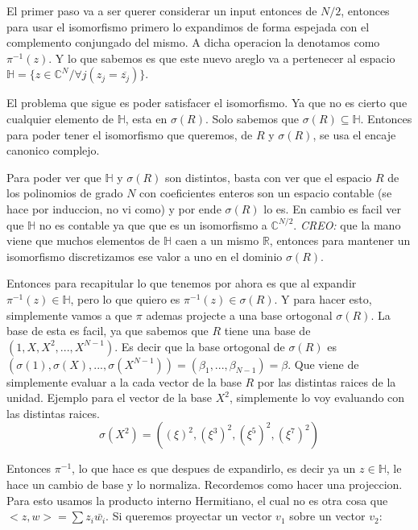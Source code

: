 \documentclass[12pt, oneside]{article}
\begin{document}
El primer paso va a ser  querer considerar un input entonces de $N/2$, entonces
para usar el isomorfismo primero lo expandimos de forma espejada con el
complemento conjungado del mismo.
A dicha operacion la denotamos como $\pi^{-1}(z)$.
Y lo que sabemos es que este nuevo areglo va a pertenecer al espacio
$\mathbb{H}=\{z\in\mathbb{C}^N/ \forall j (z_j=\overline{z_j})\}$.

El problema que sigue es poder satisfacer el isomorfismo.
Ya que no es cierto que cualquier elemento de $\mathbb{H}$,
esta en $\sigma(R)$.
Solo sabemos que $\sigma(R)\subseteq \mathbb{H}$.
Entonces para poder tener el isomorfismo que queremos, de $R$ y $\sigma(R)$,
se usa el encaje canonico complejo.

Para poder ver que $\mathbb{H}$ y $\sigma(R)$ son distintos, basta con ver que
el espacio $R$ de los polinomios de grado $N$ con coeficientes enteros son un espacio
contable (se hace por induccion, no vi como) y por ende $\sigma(R)$ lo es.
En cambio es facil ver que $\mathbb{H}$ no es contable ya que que es un isomorfismo
a $\mathbb{C}^{N/2}$.
\textit{CREO:} que la mano viene que muchos elementos de $\mathbb{H}$ caen a un mismo $\mathbb{R}$,
entonces para mantener un isomorfismo discretizamos ese valor a uno en el dominio $\sigma(R)$.

Entonces para recapitular lo que tenemos por ahora es que al expandir $\pi^{-1}(z)\in\mathbb{H}$,
pero lo que quiero es $\pi^{-1}(z)\in\sigma(R)$.
Y para hacer esto, simplemente vamos a que $\pi$ ademas projecte a una base ortogonal  $\sigma(R)$.
La base de esta es facil, ya que sabemos que $R$ tiene una base de $(1, X, X^2, ..., X^{N-1})$.
Es decir que la base ortogonal de  $\sigma(R)$ es $(\sigma(1), \sigma(X),..., \sigma(X^{N-1}))=(\beta_1,...,\beta_{N-1})=\beta$.
Que viene de simplemente evaluar a la cada vector de la base $R$ por las distintas raices de la unidad.
Ejemplo para el vector de la base $X^2$, simplemente lo voy evaluando con las distintas raices.
\begin{equation*}
    \sigma(X^2) = ((\xi)^2, (\xi^3)^2, (\xi^5)^2,(\xi^7)^2)
\end{equation*}


Entonces $\pi^{-1}$, lo que hace es que despues de expandirlo, es decir ya un $z\in\mathbb{H}$,
le hace un cambio de base y lo normaliza.
Recordemos como hacer una projeccion.
Para esto usamos la producto interno Hermitiano, el cual no es otra cosa que $<z,w>=\sum z_i\bar{w_i}$.
Si queremos proyectar un vector $v_1$ sobre un vector $v_2$:
\end{document}
